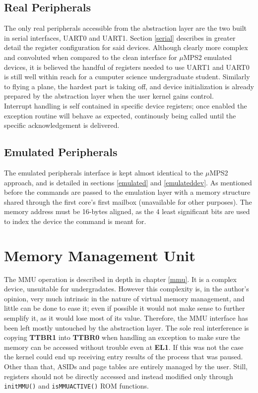 \documentclass[12pt,a4paper,openright,twoside]{report}
\begin{document}
\subsection{Real Peripherals}
The only real peripherals accessible from the abstraction layer are the two 
built in serial interfaces, UART0 and UART1.
Section \ref{serial} describes in greater detail the register configuration for
said devices. Although clearly more complex and convoluted when compared to the
clean interface for $\mu$MPS2 emulated devices, it is believed the handful of 
registers needed to use UART1 and UART0 is still well within reach for a cumputer
science undergraduate student. Similarly to flying a plane, the hardest
part is taking off, and device initialization is already prepared by the abstraction
layer when the user kernel gains control.\\
Interrupt handling is self contained in specific device registers; once enabled
the exception routine will behave as expected, continously being called until 
the specific acknowledgement is delivered.

\subsection{Emulated Peripherals}
The emulated peripherals interface is kept almost identical to the $\mu$MPS2 
approach, and is detailed in sections \ref{emulated} and \ref{emulateddev}.
As mentioned before the commands are passed to the emulation layer with a memory
structure shared through the first core's first mailbox (unavailable for other
purposes). The memory address must be 16-bytes aligned, as the 4 least significant
bits are used to index the device the command is meant for.

\section{Memory Management Unit}
The MMU operation is described in depth in chapter \ref{mmu}. It is a complex 
device, unsuitable for undergradates. However this complexity is, in the author's opinion,
very much intrinsic in the nature of virtual memory management, and little can
be done to ease it; even if possible it would not make sense to further semplify it, as 
it would lose most of its value.
Therefore, the MMU interface has been left mostly untouched by the abstraction layer.
The sole real interference is copying \textbf{TTBR1} into \textbf{TTBR0} when 
handling an exception to make sure the memory can be accessed without trouble 
even at \textbf{EL1}. If this was not the case the kernel could end up receiving 
entry results of the process that was paused.
Other than that, ASIDs and page tables are entirely managed by the user. Still,
registers should not be directly accessed and instead modified only through 
{\tt initMMU()} and {\tt isMMUACTIVE()} ROM functions.
\end{document}
